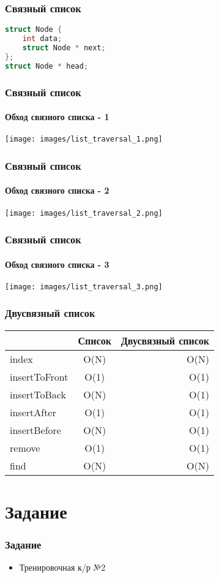 \documentclass[12pt,pdf,hyperref={unicode}]{beamer}
\begin{document}
\begin{frame}[fragile]
\frametitle{Связный список} 
\begin{lstlisting}[language=C++,basicstyle=\ttfamily,keywordstyle=\color{blue},stringstyle=\color{orange}\ttfamily]
struct Node {
	int data;
	struct Node * next;
};
struct Node * head;
\end{lstlisting}
\end{frame}



\begin{frame}[fragile]
\frametitle{Связный список} 
\framesubtitle{Обход связного списка - 1} 
\begin{center}
\texttt{[image: images/list\_traversal\_1.png]}
\end{center}
\end{frame}
\begin{frame}[fragile]
\frametitle{Связный список} 
\framesubtitle{Обход связного списка - 2} 
\begin{center}
\texttt{[image: images/list\_traversal\_2.png]}
\end{center}
\end{frame}
\begin{frame}[fragile]
\frametitle{Связный список} 
\framesubtitle{Обход связного списка - 3} 
\begin{center}
\texttt{[image: images/list\_traversal\_3.png]}
\end{center}
\end{frame}


\begin{frame}[fragile]
\frametitle{Двусвязный список}
\begin{center}
  \begin{tabular}{  l | c r }
      & Список & Двусвязный список \\
    \hline
    index & O(N) &  O(N) \\
    insertToFront & O(1) & O(1) \\
    insertToBack & O(N) & O(1) \\
    insertAfter & O(1) & O(1) \\
    insertBefore & O(N) & O(1) \\
    remove & O(1) & O(1) \\
    find & O(N) & O(N) \\
    \hline
  \end{tabular}
\end{center}
\end{frame}



\section{Задание}

\begin{frame}[fragile]
\frametitle{Задание} 
\begin{itemize}
\item Тренировочная к/р №2
\end{itemize}
\end{frame}
\end{document}
